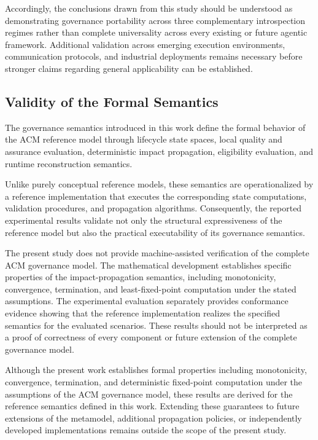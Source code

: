 \documentclass[10pt]{article}
\begin{document}
Accordingly, the conclusions drawn from this study should be understood as demonstrating governance portability across three complementary introspection regimes rather than complete universality across every existing or future agentic framework. Additional validation across emerging execution environments, communication protocols, and industrial deployments remains necessary before stronger claims regarding general applicability can be established.


\subsection{Validity of the Formal Semantics}
\label{sec:validity_formal_semantics}

The governance semantics introduced in this work define the formal behavior of the ACM reference model through lifecycle state spaces, local quality and assurance evaluation, deterministic impact propagation, eligibility evaluation, and runtime reconstruction semantics.

Unlike purely conceptual reference models, these semantics are operationalized by a reference implementation that executes the corresponding state computations, validation procedures, and propagation algorithms. Consequently, the reported experimental results validate not only the structural expressiveness of the reference model but also the practical executability of its governance semantics.

The present study does not provide machine-assisted verification of the complete ACM governance model. The mathematical development establishes specific properties of the impact-propagation semantics, including monotonicity, convergence, termination, and least-fixed-point computation under the stated assumptions. The experimental evaluation separately provides conformance evidence showing that the reference implementation realizes the specified semantics for the evaluated scenarios. These results should not be interpreted as a proof of correctness of every component or future extension of the complete governance model.

Although the present work establishes formal properties including monotonicity, convergence, termination, and deterministic fixed-point computation under the assumptions of the ACM governance model, these results are derived for the reference semantics defined in this work. Extending these guarantees to future extensions of the metamodel, additional propagation policies, or independently developed implementations remains outside the scope of the present study.
\end{document}
